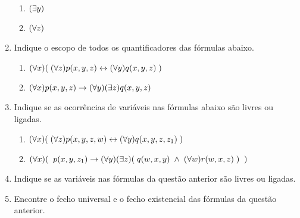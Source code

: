 \begin{enumerate}
\begin{enumerate}
      \item $(\exists y)$
      \item $(\forall z)$
    \end{enumerate}
  \item Indique o escopo de todos os quantificadores das fórmulas abaixo.
    \begin{enumerate}
      \item $(\forall x) ( \; (\forall z) p(x,y,z) \leftrightarrow (\forall y) q(x,y,z) \; )$
      \item $(\forall x) p(x,y,z) \rightarrow (\forall y) (\exists z) q(x,y,z)$
    \end{enumerate}
  \item Indique se as ocorrências de variáveis nas fórmulas abaixo são livres ou ligadas.
    \begin{enumerate}
      \item $(\forall x) ( \; (\forall z) p(x,y,z, w) \leftrightarrow (\forall y) q(x,y,z, z_1) \; )$
      \item $(\forall x) ( \;\; p(x,y,z_1) \rightarrow (\forall y) (\exists z) ( \; q(w,x,y) \;\land\; (\forall w) r(w,x,z) \; ) \;\; )$
    \end{enumerate}
  \item Indique se as variáveis nas fórmulas da questão anterior são livres ou ligadas.
  \item Encontre o fecho universal e o fecho existencial das fórmulas da questão anterior.

\end{enumerate}



